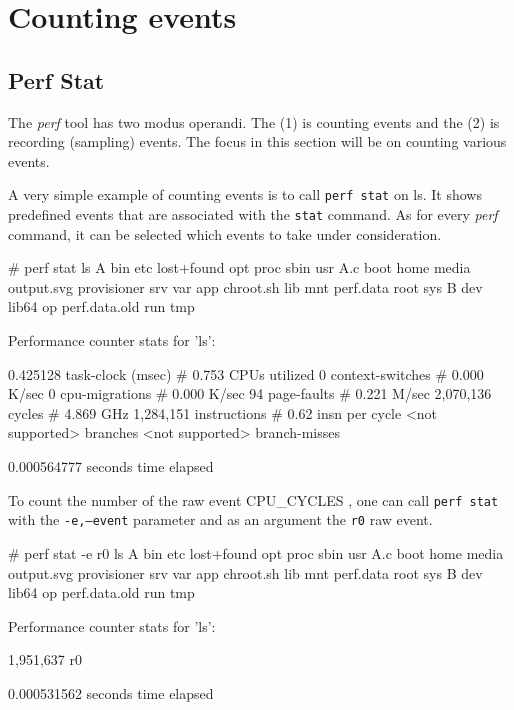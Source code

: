 \chapter{Counting events}
\section{Perf Stat}
The {\em perf} tool has two modus operandi. The (1) is counting events
and the (2) is recording (sampling) events. The focus in this section
will be on counting various events.

A very simple example of counting events is to call {\tt perf stat} on ls.
It shows predefined events that are associated with the {\tt stat} command.
As for every {\em perf} command, it can be selected which events to take
under consideration.

\starttyping
# perf stat ls
A    bin	etc    lost+found  opt		  proc	       sbin  usr
A.c  boot	home   media	   output.svg	  provisioner  srv   var
app  chroot.sh	lib    mnt	   perf.data	  root	       sys
B    dev	lib64  op	   perf.data.old  run	       tmp

 Performance counter stats for 'ls':

          0.425128      task-clock (msec)         #    0.753 CPUs utilized
                 0      context-switches          #    0.000 K/sec
                 0      cpu-migrations            #    0.000 K/sec
                94      page-faults               #    0.221 M/sec
         2,070,136      cycles                    #    4.869 GHz
         1,284,151      instructions              #    0.62  insn per cycle
   <not supported>      branches
   <not supported>      branch-misses

       0.000564777 seconds time elapsed

\stoptyping

To count the number of the raw event CPU_CYCLES , one can call {\tt perf
stat} with the {\tt -e,--event} parameter and as an argument the {\tt r0}
raw event.

\starttyping
# perf stat -e r0 ls
A    bin	etc    lost+found  opt		  proc	       sbin  usr
A.c  boot	home   media	   output.svg	  provisioner  srv   var
app  chroot.sh	lib    mnt	   perf.data	  root	       sys
B    dev	lib64  op	   perf.data.old  run	       tmp

 Performance counter stats for 'ls':

         1,951,637      r0

       0.000531562 seconds time elapsed

